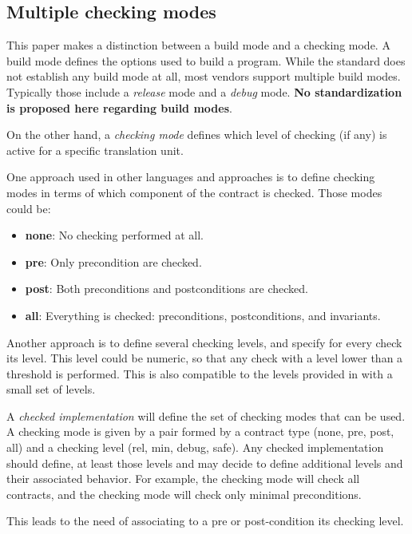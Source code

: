 \subsection{Multiple checking modes}

This paper makes a distinction between a build mode and a checking mode. A build
mode defines the options used to build a program. While the standard does not
establish any build mode at all, most vendors support multiple build modes.
Typically those include a \emph{release} mode and a \emph{debug} mode. \textbf{No
standardization is proposed here regarding build modes}.

On the other hand, a \emph{checking mode} defines which level of checking (if any) is
active for a specific translation unit.

One approach used in other languages and approaches is to define checking modes
in terms of which component of the contract is checked.
Those modes could be:

\begin{itemize}
  \item \textbf{none}: No checking performed at all.
  \item \textbf{pre}: Only precondition are checked.
  \item \textbf{post}: Both preconditions and postconditions are checked.
  \item \textbf{all}: Everything is checked: preconditions, postconditions, and
invariants.
\end{itemize}

Another approach is to define several checking levels, and specify for every
check its level. This level could be numeric, so that any check with a level
lower than a threshold is performed. This is also compatible to the levels
provided in \cite{n4135} with a small set of levels.

A \emph{checked implementation} will define the set of checking modes that
can be used. A checking mode is given by a pair formed by a contract type (none,
pre, post, all) and a checking level (rel, min, debug, safe). Any checked
implementation should define, at least those levels and may decide to define
additional levels and their associated behavior. For example, the checking mode
 will check all contracts, and the checking mode
 will check only minimal preconditions.

This leads to the need of associating to a pre or post-condition its checking
level.

